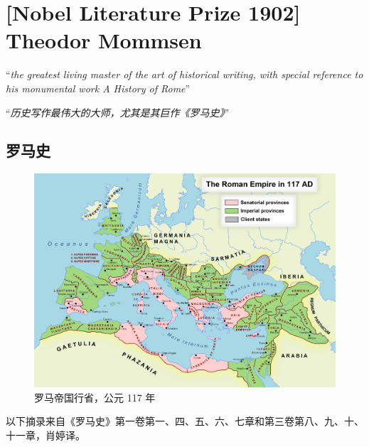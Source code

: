 \section{[Nobel Literature Prize 1902] Theodor Mommsen}

``\textit{the greatest living master of the art of historical writing, with
  special reference to his monumental work A History of Rome}''

“\textit{历史写作最伟大的大师，尤其是其巨作《罗马史》}”

\subsection{罗马史}

\begin{figure}[H]
\centering
\includegraphics[width=0.95\linewidth]{HMZ5-roman-empire-117.png}
\caption{罗马帝国行省，公元 117 年}
\label{fig:romanempire}
\end{figure}

以下摘录来自《罗马史》第一卷第一、四、五、六、七章和第三卷第八、九、十、十一章，肖婷译。
